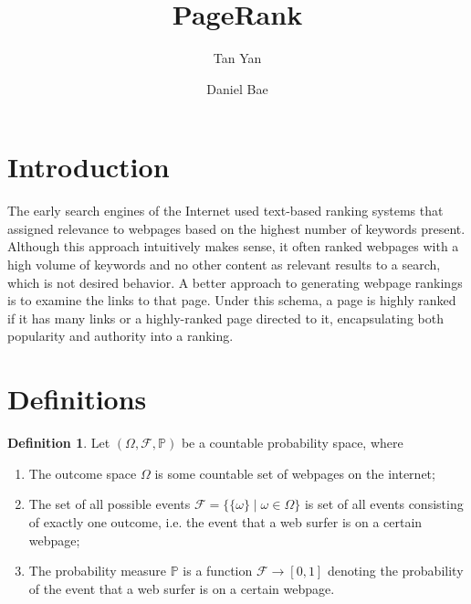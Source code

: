 \documentclass[11pt]{article}
\title{PageRank}
\author{Tan Yan \and Daniel Bae}
\theoremstyle{definition}
\newtheorem{definition}{Definition}
\begin{document}
\maketitle

\section{Introduction}
The early search engines of the Internet used text-based ranking systems that assigned relevance to webpages based on the highest number of keywords present. 
Although this approach intuitively makes sense, it often ranked webpages with a high volume of keywords and no other content as relevant results to a search, which is not desired behavior.
A better approach to generating webpage rankings is to examine the links to that page.
Under this schema, a page is highly ranked if it has many links or a highly-ranked page directed to it, encapsulating both popularity and authority into a ranking.

\section{Definitions}
\begin{definition}
    Let $(\Omega, \mathcal{F}, \mathbb{P})$ be a countable probability space, where
    \begin{enumerate}
        \item The outcome space $\Omega$ is some countable set of webpages on the internet;
        \item The set of all possible events $\mathcal{F} = \{ \{\omega\} \mid \omega \in \Omega \}$ is set of all events consisting of exactly one outcome, i.e. the event that a web surfer is on a certain webpage;
        \item The probability measure $\mathbb{P}$ is a function $\mathcal{F} \to [0,1]$ denoting the probability of the event that a web surfer is on a certain webpage.
    \end{enumerate}
\end{definition}
\end{document}
